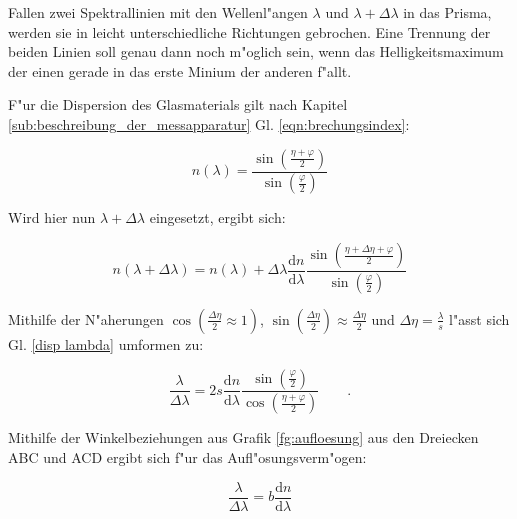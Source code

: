 	Fallen zwei Spektrallinien mit den Wellenl"angen $\lambda$ und $\lambda + \Delta\lambda$ in das Prisma, werden sie in leicht unterschiedliche Richtungen gebrochen.
	Eine Trennung der beiden Linien soll genau dann noch m"oglich sein, wenn das Helligkeitsmaximum der einen gerade in das erste Minium der anderen f"allt.

	F"ur die Dispersion des Glasmaterials gilt nach Kapitel \ref{sub:beschreibung_der_messapparatur} Gl. \eqref{eqn:brechungsindex}:

	\begin{equation}
		n(\lambda) = \frac{\sin( \frac{\eta + \varphi}{2} )}{\sin(\frac{\varphi}{2})} 
	\end{equation}

	Wird hier nun $\lambda + \Delta\lambda$ eingesetzt, ergibt sich:

	\begin{equation}
		n(\lambda + \Delta\lambda) = n(\lambda) + \Delta\lambda \frac{\mathrm{d}n}{\mathrm{d}\lambda}	\frac{\sin( \frac{\eta + \Delta\eta + \varphi}{2} )}{\sin(\frac{\varphi}{2})}  \label{disp lambda}
	\end{equation}

	Mithilfe der N"aherungen $\cos(\frac{\Delta\eta}{2} \approx 1)$, $\sin(\frac{\Delta\eta}{2}) \approx \frac{\Delta\eta}{2}$ und $\Delta\eta = \frac{\lambda}{s}$ l"asst sich Gl. \eqref{disp lambda} umformen zu:

	\begin{equation}
		\frac{\lambda}{\Delta\lambda} = 2s \frac{\mathrm{d}n}{\mathrm{d}\lambda} \frac{\sin(\frac{\varphi}{2})}{\cos(\frac{\eta+\varphi}{2})} \qquad .
	\end{equation}

	Mithilfe der Winkelbeziehungen aus Grafik \ref{fg:aufloesung} aus den Dreiecken ABC und ACD ergibt sich f"ur das Aufl"osungsverm"ogen:

	\begin{equation}
		\frac{\lambda}{\Delta\lambda} = b \frac{\mathrm{d}n}{\mathrm{d}\lambda} 
	\end{equation}